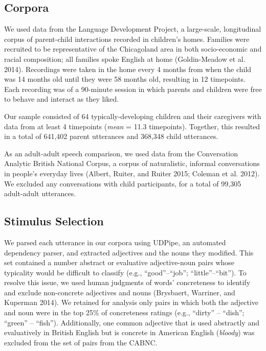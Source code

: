 \documentclass{ucetd}
\begin{document}
\hypertarget{corpora}{%
\subsection{Corpora}\label{corpora}}

We used data from the Language Development Project, a large-scale,
longitudinal corpus of parent-child interactions recorded in children's
homes. Families were recruited to be representative of the Chicagoland
area in both socio-economic and racial composition; all families spoke
English at home (Goldin-Meadow et al. 2014). Recordings were taken in
the home every 4 months from when the child was 14 months old until they
were 58 months old, resulting in 12 timepoints. Each recording was of a
90-minute session in which parents and children were free to behave and
interact as they liked.

Our sample consisted of 64 typically-developing children and their
caregivers with data from at least 4 timepoints (\emph{mean} = 11.3
timepoints). Together, this resulted in a total of 641,402 parent
utterances and 368,348 child utterances.

As an adult-adult speech comparison, we used data from the Conversation
Analytic British National Corpus, a corpus of naturalistic, informal
conversations in people's everyday lives (Albert, Ruiter, and Ruiter
2015; Coleman et al. 2012). We excluded any conversations with child
participants, for a total of 99,305 adult-adult utterances.

\hypertarget{stimulus-selection}{%
\subsection{Stimulus Selection}\label{stimulus-selection}}

We parsed each utterance in our corpora using UDPipe, an automated
dependency parser, and extracted adjectives and the nouns they modified.
This set contained a number abstract or evaluative adjective-noun pairs
whose typicality would be difficult to classify (e.g.,
``good''--``job''; ``little''--``bit''). To resolve this issue, we used
human judgments of words' concreteness to identify and exclude
non-concrete adjectives and nouns (Brysbaert, Warriner, and Kuperman
2014). We retained for analysis only pairs in which both the adjective
and noun were in the top 25\% of concreteness ratings (e.g., ``dirty''
-- ``dish''; ``green'' -- ``fish''). Additionally, one common adjective
that is used abstractly and evaluatively in British English but is
concrete in American English (\emph{bloody}) was excluded from the set
of pairs from the CABNC.
\end{document}
